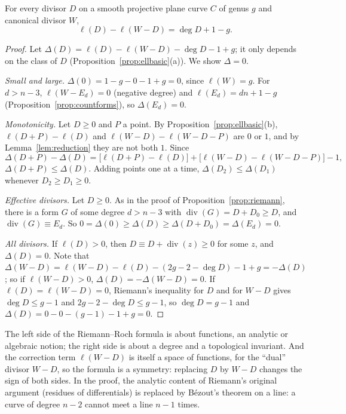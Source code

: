 \begin{theorem}\label{thm:rr}
For every divisor $D$ on a smooth projective plane curve $C$ of genus $g$ and canonical divisor $W$,
\[
\ell(D)-\ell(W-D)=\deg D+1-g.
\]
\end{theorem}
\begin{proof}
Let $\Delta(D)=\ell(D)-\ell(W-D)-\deg D-1+g$; it only depends on the class of $D$ (Proposition~\ref{prop:ellbasic}(a)). We show $\Delta=0$.

\emph{Small and large.} $\Delta(0)=1-g-0-1+g=0$, since $\ell(W)=g$. For $d>n-3$, $\ell(W-E_d)=0$ (negative degree) and $\ell(E_d)=dn+1-g$
(Proposition~\ref{prop:countforms}), so $\Delta(E_d)=0$.

\emph{Monotonicity.} Let $D\ge0$ and $P$ a point. By Proposition~\ref{prop:ellbasic}(b), $\ell(D+P)-\ell(D)$ and $\ell(W-D)-\ell(W-D-P)$ are $0$ or $1$, and by
Lemma~\ref{lem:reduction} they are not both $1$. Since
\[
\Delta(D+P)-\Delta(D)=\bigl[\ell(D+P)-\ell(D)\bigr]+\bigl[\ell(W-D)-\ell(W-D-P)\bigr]-1,
\]
$\Delta(D+P)\le\Delta(D)$. Adding points one at a time, $\Delta(D_2)\le\Delta(D_1)$ whenever $D_2\ge D_1\ge0$.

\emph{Effective divisors.} Let $D\ge0$. As in the proof of Proposition~\ref{prop:riemann}, there is a form $G$ of some degree $d>n-3$ with
$\operatorname{div}(G)=D+D_0\ge D$, and $\operatorname{div}(G)\equiv E_d$. So $0=\Delta(0)\ge\Delta(D)\ge\Delta(D+D_0)=\Delta(E_d)=0$.

\emph{All divisors.} If $\ell(D)>0$, then $D\equiv D+\operatorname{div}(z)\ge0$ for some $z$, and $\Delta(D)=0$. Note that
$\Delta(W-D)=\ell(W-D)-\ell(D)-(2g-2-\deg D)-1+g=-\Delta(D)$; so if $\ell(W-D)>0$, $\Delta(D)=-\Delta(W-D)=0$. If $\ell(D)=\ell(W-D)=0$, Riemann's inequality
for $D$ and for $W-D$ gives $\deg D\le g-1$ and $2g-2-\deg D\le g-1$, so $\deg D=g-1$ and $\Delta(D)=0-0-(g-1)-1+g=0$.
\end{proof}

\begin{beauty}
The left side of the Riemann--Roch formula is about functions, an analytic or algebraic notion; the right side is about a degree and a
topological invariant. And the correction term $\ell(W-D)$ is itself a space of functions, for the ``dual'' divisor $W-D$, so the formula is a
symmetry: replacing $D$ by $W-D$ changes the sign of both sides. In the proof, the analytic content of Riemann's original argument (residues of
differentials) is replaced by B\'ezout's theorem on a line: a curve of degree $n-2$ cannot meet a line $n-1$ times.
\end{beauty}

